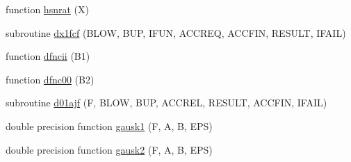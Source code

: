 \begin{DoxyCompactItemize}
function \hyperlink{djangoh__h_8f_aaa4433d273f93a7dc6df818581550188}{hsnrat} (X)
\item 
subroutine \hyperlink{djangoh__h_8f_a4f17d177d9df6c5976dd9b3fba939dec}{dx1fcf} (B\+L\+O\+W, B\+U\+P, I\+F\+U\+N, A\+C\+C\+R\+E\+Q, A\+C\+C\+F\+I\+N, R\+E\+S\+U\+L\+T, I\+F\+A\+I\+L)
\item 
function \hyperlink{djangoh__h_8f_a8423a3e922ac2752697c02850b5e3954}{dfncii} (B1)
\item 
function \hyperlink{djangoh__h_8f_a31e46a579ba814863858c9d93756893d}{dfnc00} (B2)
\item 
subroutine \hyperlink{djangoh__h_8f_a5575d5270ee0e5cede47701657715310}{d01ajf} (F, B\+L\+O\+W, B\+U\+P, A\+C\+C\+R\+E\+L, R\+E\+S\+U\+L\+T, A\+C\+C\+F\+I\+N, I\+F\+A\+I\+L)
\item 
double precision function \hyperlink{djangoh__h_8f_a1aed970120eadb2285e5b9ce8df951bf}{gausk1} (F, A, B, E\+P\+S)
\item 
double precision function \hyperlink{djangoh__h_8f_aaf9cf7dde73f44b854176970c334b11b}{gausk2} (F, A, B, E\+P\+S)
\end{DoxyCompactItemize}


